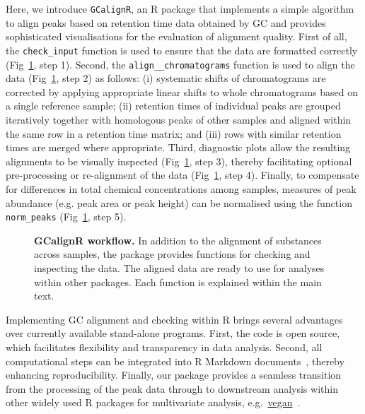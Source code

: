 \documentclass[10pt,letterpaper]{article}
\begin{document}
Here, we introduce \texttt{GCalignR}, an R package that implements a simple algorithm to align peaks based on retention time data obtained by GC and provides sophisticated visualisations for the evaluation of alignment quality. First of all, the \texttt{check\_input} function is used to ensure that the data are formatted correctly (Fig~\ref{Fig:Fig1}, step 1). Second, the \texttt{align\_\_chromatograms} function is used to align the data (Fig~\ref{Fig:Fig1}, step 2) as follows: (i) systematic shifts of chromatograms are corrected by applying appropriate linear shifts to whole chromatograms based on a single reference sample; (ii) retention times of individual peaks are grouped iteratively together with homologous peaks of other samples and aligned within the same row in a retention time matrix; and (iii) rows with similar retention times are merged where appropriate. Third, diagnostic plots allow the resulting alignments to be visually inspected (Fig~\ref{Fig:Fig1}, step 3), thereby facilitating optional pre-processing or re-alignment of the data (Fig~\ref{Fig:Fig1}, step 4). Finally, to compensate for differences in total chemical concentrations among samples, measures of peak abundance (e.g. peak area or peak height) can be normalised using the function \texttt{norm\_peaks} (Fig~\ref{Fig:Fig1}, step 5). \par

\begin{figure}[htbp]
\centering
\caption{\textbf{GCalignR workflow.}
In addition to the alignment of substances across samples, the package provides functions for checking and inspecting the data. The aligned data are ready to use for analyses within other packages. Each function is explained within the main text.}
\label{Fig:Fig1}
\end{figure}

Implementing GC alignment and checking within R brings several advantages over currently available stand-alone programs. First, the code is open source, which facilitates flexibility and transparency in data analysis. Second, all computational steps can be integrated into R Markdown documents~\cite{Allaire.2016}, thereby enhancing reproducibility. Finally, our package provides a seamless transition from the processing of the peak data through to downstream analysis within other widely used R packages for multivariate analysis, e.g.~\href{https://CRAN.R-project.org/package=vegan}{vegan}~\cite{Oksanen.2016}.
\end{document}
